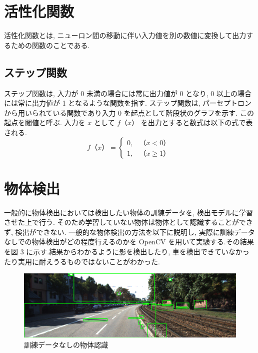 \section{活性化関数}
活性化関数とは, ニューロン間の移動に伴い入力値を別の数値に変換して出力するための関数のことである.
\subsection{ステップ関数}
ステップ関数は, 入力が 0 未満の場合には常に出力値が 0 となり, 0 以上の場合には常に出力値が 1 となるような関数を指す. ステップ関数は, パーセプトロンから用いられている関数であり入力 0 を起点として階段状のグラフを示す. この起点を閾値と呼ぶ. 入力を $x$ として $f（x）$ を出力とすると数式は以下の式で表される.
\begin{equation}
f（x）= \begin{cases}
0, & （x < 0）\\
1, & （x \geq 1）
\end{cases}
\end{equation}

\section{物体検出}
一般的に物体検出においては検出したい物体の訓練データを, 検出モデルに学習させた上で行う. そのため学習していない物体は物体として認識することができず, 検出ができない. 一般的な物体検出の方法を以下に説明し, 実際に訓練データなしでの物体検出がどの程度行えるのかを OpenCV を用いて実験する.その結果を図 3 に示す.結果からわかるように影を検出したり, 車を検出できていなかったり実用に耐えうるものではないことがわかった. 
 \begin{figure}[hb]
\includegraphics[scale=0.4]{object.png}
 \caption{訓練データなしの物体認識}
\end{figure}
